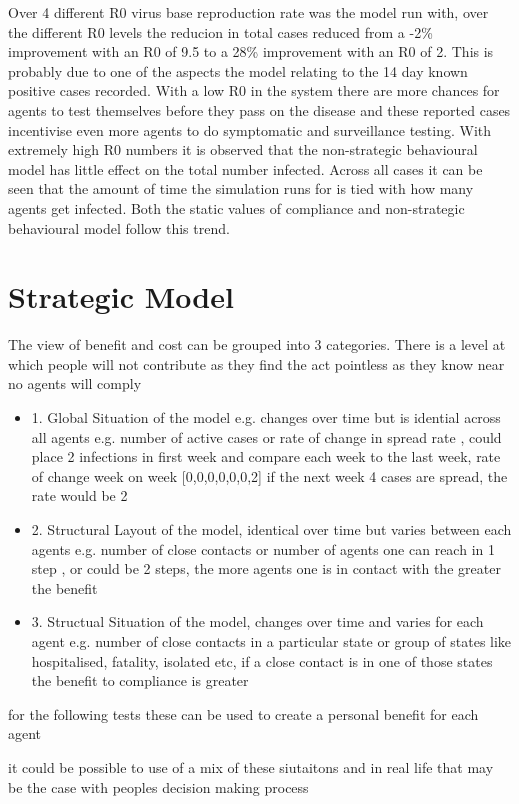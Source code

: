 \documentclass{article}
\begin{document}
Over 4 different R0 virus base reproduction rate was the model run with, over the different R0 levels the reducion in total cases reduced from a -2\% improvement with an R0 of 9.5 to a 28\% improvement with an R0 of 2. This is probably due to one of the aspects the model relating to the 14 day known positive cases recorded. With a low R0 in the system there are more chances for agents to test themselves before they pass on the disease and these reported cases incentivise even more agents to do symptomatic and surveillance testing. With extremely high R0 numbers it is observed that the non-strategic behavioural model has little effect on the total number infected. Across all cases it can be seen that the amount of time the simulation runs for is tied with how many agents get infected. Both the static values of compliance and non-strategic behavioural model follow this trend. 



\section{Strategic Model}
The view of benefit and cost can be grouped into 3 categories.
There is a level at which people will not contribute as they find the act pointless as they know near no agents  will comply 
\begin{itemize}
\item1. Global Situation of the model e.g. changes over time but is idential across all agents
e.g. number of active cases or rate of change in spread rate , could place 2 infections in first week and compare each week to the last week, rate of change week on week
[0,0,0,0,0,0,2]  if the next week 4 cases are spread, the rate would be 2
\item2. Structural Layout of the model, identical over time but varies between each agents
e.g. number of close contacts or number of agents one can reach in 1 step , or could be 2 steps, the more agents one is in contact with the greater the benefit 
\item3. Structual Situation of the model, changes over time and varies for each agent
e.g. number of close contacts in a particular state or group of states like hospitalised, fatality, isolated etc, if a close contact is in one of those states the benefit to compliance is greater
\end{itemize}



for the following tests these can be used to create a personal benefit for each agent 

it could be possible to use of a mix of these siutaitons and in real life that may be the case with peoples decision making process
\end{document}
